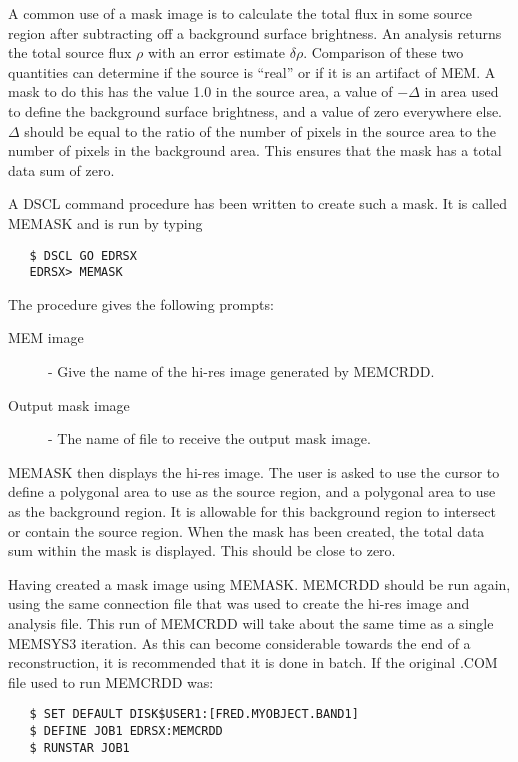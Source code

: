 A common use of a mask image is to calculate the total flux in some source
region after subtracting off a background surface brightness. An analysis
returns the total source flux $\rho$ with an error estimate $\delta\rho$.
Comparison of these two quantities can determine if the source is ``real'' or
if  it is an artifact of MEM. A mask to do this has the value 1.0 in the source
area, a value of $-\Delta$ in area used to define the background surface
brightness, and a value of zero everywhere else. $\Delta$ should be equal to
the  ratio of the number of pixels in the source area to the number of pixels
in the  background area. This ensures that the mask has a total data sum of
zero.

A DSCL command procedure has been written to create such a mask. It is called
MEMASK and is run by typing

\begin{verbatim}
   $ DSCL GO EDRSX
   EDRSX> MEMASK
\end{verbatim}

The procedure gives the following prompts:

\begin {description}
\item [MEM image] - Give the name of the hi-res image generated by MEMCRDD.
\item [Output mask image] - The name of file to receive the output mask image.
\end {description}

MEMASK then displays the hi-res image. The user is asked to use the cursor to
define a polygonal area to use as the source region, and a polygonal area to use
as the background region. It is allowable for this background region to
intersect or contain the source region. When the mask has been created, the
total data sum within the mask is displayed. This should be close to zero.

Having created a mask image using MEMASK. MEMCRDD should be run again, using
the same connection file that was used to create the hi-res image and analysis
file. This run of MEMCRDD will take about the same time as a single MEMSYS3
iteration. As this can become considerable towards the end of a reconstruction,
it is recommended that it is done in batch. If the original .COM file used to
run MEMCRDD was:

\begin{verbatim}
   $ SET DEFAULT DISK$USER1:[FRED.MYOBJECT.BAND1]
   $ DEFINE JOB1 EDRSX:MEMCRDD
   $ RUNSTAR JOB1
\end{verbatim}

